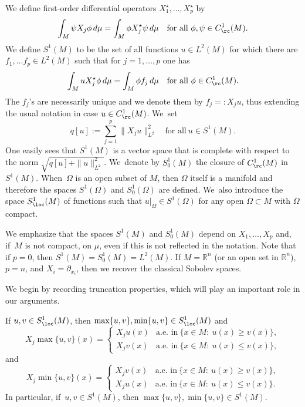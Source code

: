 We define first-order differential operators $X_1^\star,\ldots,X_p^\star$ by
\[
\int_M \psi X_j \phi\,d\mu = \int_M \phi X_j^\star \psi\,d\mu
\quad\text{for all}\ \phi,\psi\in C^1_\rc(M).
\]
We define $S^1(M)$ to be the set of all functions $u\in L^2(M)$ for which there are $f_1,\ldots f_p\in L^2(M)$ such that for $j=1,\ldots,p$ one has
\[
\int_M u X_j^\star\phi\,d\mu = \int_M \phi f_j\,d\mu
\quad\text{for all}\ \phi\in C^1_\rc(M).
\]
The $f_j$'s are necessarily unique and we denote them by $f_j=:X_j u$, thus extending the usual notation in case $u\in C^1_\rc(M)$. We~set
\[
q[u] := \sum_{j=1}^p \|X_j u\|_{L^2}^2
\quad\text{for all}\ u\in S^1(M).
\]
One easily sees that $S^1(M)$ is a vector space that is complete with respect to the norm $\sqrt{q[u] + \|u\|_{L^2}^2}$. We~denote by $S^1_0(M)$ the closure of $C^1_\rc(M)$ in $S^1(M)$. When~$\Omega$ is an open subset of $M$, then $\Omega$ itself is a manifold and therefore the spaces $S^1(\Omega)$ and $S^1_0(\Omega)$ are defined. We~also introduce the space $S^1_\loc(M)$ of functions such that $u|_\Omega \in S^1(\Omega)$ for any open $\Omega\subset M$ with $\overline\Omega$ compact.

We emphasize that the spaces $S^1(M)$ and $S^1_0(M)$ depend on $X_1,\ldots,X_p$ and, if~$M$ is not compact, on $\mu$, even if this is not reflected in the notation. Note that if $p=0$, then $S^1(M)=S^1_0(M)=L^2(M)$.
If $M=\mathbb R^n$ (or an open set in $\mathbb R^n$), $p=n$, and $X_i=\partial_{x_i}$, then we recover the classical Sobolev spaces.

We begin by recording truncation properties, which will play an important role in our arguments.

\begin{lemma}\label{truncation}
If $u,v\in S^1_\loc(M)$, then $\max\{u,v\}, \min\{u,v\}\in S^1_\loc(M)$ and
\[
X_j \max\{u,v\}(x) = \begin{cases}
X_j u(x) & \text{a.e.\ in}\ \{ x\in M:\ u(x)\geq v(x)\},\\
X_jv(x) & \text{a.e.\ in}\ \{ x\in M:\ u(x)\leq v(x)\},
\end{cases}
\]
and
\[
X_j \min\{u,v\}(x) = \begin{cases}
X_j v(x) & \text{a.e.\ in}\ \{ x \in M:\ u(x)\geq v(x) \},\\
X_ju(x) & \text{a.e.\ in}\ \{ x \in M:\ u(x)\leq v(x) \}.
\end{cases}
\]
In particular, if~$u,v\in S^1(M)$, then $\max\{u,v\}, \min\{u,v\}\in S^1(M)$.
\end{lemma}

